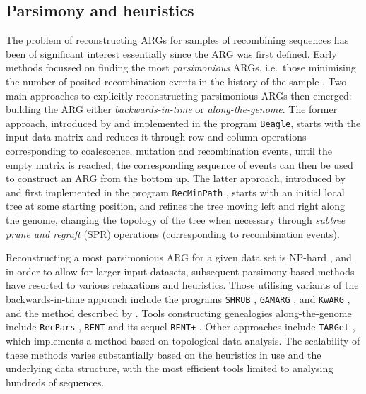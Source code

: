 \documentclass{article}
\begin{document}
\subsection*{Parsimony and heuristics}
The problem of reconstructing ARGs for samples of recombining sequences has been of significant
 interest essentially since the ARG was first defined. Early methods focussed on finding the most
 \emph{parsimonious} ARGs, i.e.\ those minimising the number of posited recombination events in
 the history of the sample \citep{hein1990reconstructing}. Two main approaches to explicitly reconstructing
 parsimonious ARGs then emerged: building the ARG either \emph{backwards-in-time} or \emph{along-the-genome}.
 The former approach, introduced by \citet{lyngso2005minimum} and implemented in the program
 \texttt{Beagle}, starts with the input data matrix and reduces it through row and column operations
 corresponding to coalescence, mutation and recombination events, until the empty matrix is reached;
 the corresponding sequence of events can then be used to construct an ARG from the bottom up. The
 latter approach, introduced by \citet{song2003parsimonious} and first implemented in the program
 \texttt{RecMinPath} \citep{song2005constructing}, starts with an initial local tree at some starting
 position, and refines the tree moving left and right along the genome, changing the topology of the
 tree when necessary through \emph{subtree prune and regraft} (SPR) operations (corresponding to
 recombination events).

Reconstructing a most parsimonious ARG for a given data set is NP-hard \citep{wang2001perfect},
and in order to allow for larger input datasets, subsequent parsimony-based methods have resorted
to various relaxations and heuristics. Those utilising variants of the backwards-in-time approach
include the programs \texttt{SHRUB} \citep{song2005efficient}, \texttt{GAMARG} \citep{thao2019hybrid},
and \texttt{KwARG} \citep{ignatieva2021kwarg}, and the method described by \citet{wu2008association}.
Tools constructing genealogies along-the-genome include \texttt{RecPars} \citep{hein1993heuristic},
\texttt{RENT} \citep{wu2011new} and its sequel \texttt{RENT+} \citep{mirzaei2017rent}. Other approaches
include \texttt{TARGet} \citep{camara2016inference}, which implements a method based on topological
data analysis. The scalability of these methods varies substantially based on the heuristics in use
and the underlying data structure, with the most efficient tools limited to analysing hundreds of
sequences.
\end{document}
